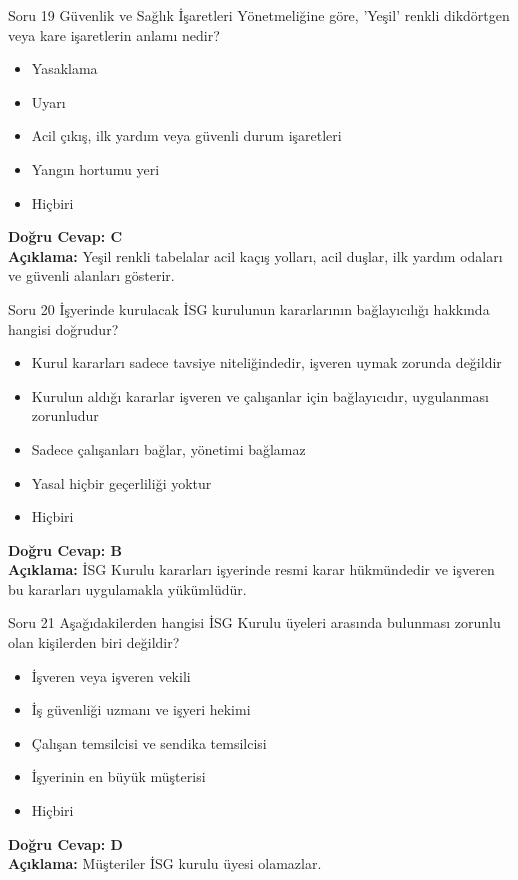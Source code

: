 \documentclass[12pt,a4paper]{article}
\begin{document}
\begin{testcard}{Soru 19}
    Güvenlik ve Sağlık İşaretleri Yönetmeliğine göre, 'Yeşil' renkli dikdörtgen veya kare işaretlerin anlamı nedir?
    \begin{itemize}
        \item[A)] Yasaklama
        \item[B)] Uyarı
        \item[C)] Acil çıkış, ilk yardım veya güvenli durum işaretleri
        \item[D)] Yangın hortumu yeri
        \item[E)] Hiçbiri
    \end{itemize}
    \tcblower
    \textbf{Doğru Cevap: C} \\
    \textbf{Açıklama:} Yeşil renkli tabelalar acil kaçış yolları, acil duşlar, ilk yardım odaları ve güvenli alanları gösterir.
\end{testcard}

\begin{testcard}{Soru 20}
    İşyerinde kurulacak İSG kurulunun kararlarının bağlayıcılığı hakkında hangisi doğrudur?
    \begin{itemize}
        \item[A)] Kurul kararları sadece tavsiye niteliğindedir, işveren uymak zorunda değildir
        \item[B)] Kurulun aldığı kararlar işveren ve çalışanlar için bağlayıcıdır, uygulanması zorunludur
        \item[C)] Sadece çalışanları bağlar, yönetimi bağlamaz
        \item[D)] Yasal hiçbir geçerliliği yoktur
        \item[E)] Hiçbiri
    \end{itemize}
    \tcblower
    \textbf{Doğru Cevap: B} \\
    \textbf{Açıklama:} İSG Kurulu kararları işyerinde resmi karar hükmündedir ve işveren bu kararları uygulamakla yükümlüdür.
\end{testcard}

\begin{testcard}{Soru 21}
    Aşağıdakilerden hangisi İSG Kurulu üyeleri arasında bulunması zorunlu olan kişilerden biri değildir?
    \begin{itemize}
        \item[A)] İşveren veya işveren vekili
        \item[B)] İş güvenliği uzmanı ve işyeri hekimi
        \item[C)] Çalışan temsilcisi ve sendika temsilcisi
        \item[D)] İşyerinin en büyük müşterisi
        \item[E)] Hiçbiri
    \end{itemize}
    \tcblower
    \textbf{Doğru Cevap: D} \\
    \textbf{Açıklama:} Müşteriler İSG kurulu üyesi olamazlar.
\end{testcard}
\end{document}

